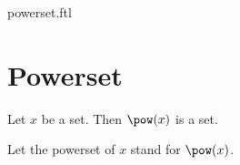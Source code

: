 \documentclass{naproche-library}
\begin{document}
\begin{smodule}{powerset.ftl}

  \section{Powerset}

  \begin{axiom}[forthel,title=Powerset Axiom,id=FOUNDATIONS_10_5862230203564032,printid]
    Let $x$ be a set.
    Then $\pow(x)$ is a set.

    Let the powerset of $x$ stand for $\pow(x)$.
  \end{axiom}
\end{smodule}
\end{document}
